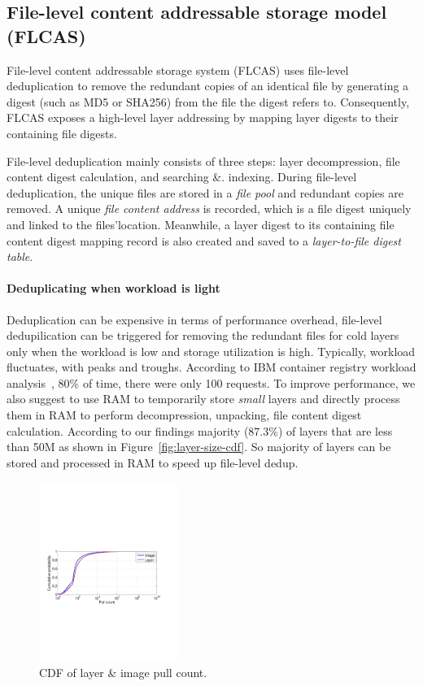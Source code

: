 \subsection{File-level content addressable storage model (FLCAS)}
File-level content addressable storage system (FLCAS) uses file-level
deduplication to remove the redundant copies of an identical file by generating
a digest (such as MD5 or SHA256) from the file the digest refers to.
%
Consequently, FLCAS exposes a high-level layer addressing by mapping layer
digests to their containing file digests. 

File-level deduplication mainly consists of three
steps: layer decompression, file content digest calculation, and searching \&.
indexing. 
% 
During file-level deduplication, the unique files are stored in a
\textit{file pool} and redundant copies are removed. 
%
A unique \textit{file
content address} is recorded, which is a file digest uniquely and linked to the
files'location. 
%
Meanwhile, a layer digest to its containing file content digest
mapping record is also created and saved to a \textit{layer-to-file digest
table}.     

\paragraph{Deduplicating when workload is light}

%

Deduplication can be expensive in terms of performance overhead, file-level
dedupilication can be triggered for removing the redundant files for cold
layers only when the workload is low and storage utilization is high.
%  
Typically,
workload fluctuates, with peaks and troughs. 
%
According to IBM container
registry workload analysis~\cite{dockerworkload}, 80\% of time, there were only 100
requests.
%
To improve performance, we also suggest to use
RAM to temporarily store \textit{small} layers and directly process them in RAM
to perform decompression, unpacking, file content digest calculation.
%
According to our findings majority (87.3\%) of layers that are less than 50M as
shown in Figure~\ref{fig:layer-size-cdf}.
%
So majority of layers can be stored
and processed in RAM to speed up file-level dedup. 

\begin{figure}
	\centering
	\includegraphics[width=0.4\textwidth]{graphs/pull-cnt.pdf}
	\caption{CDF of layer \& image pull count.
	}
	\label{fig:pull-cnt}
\end{figure}

